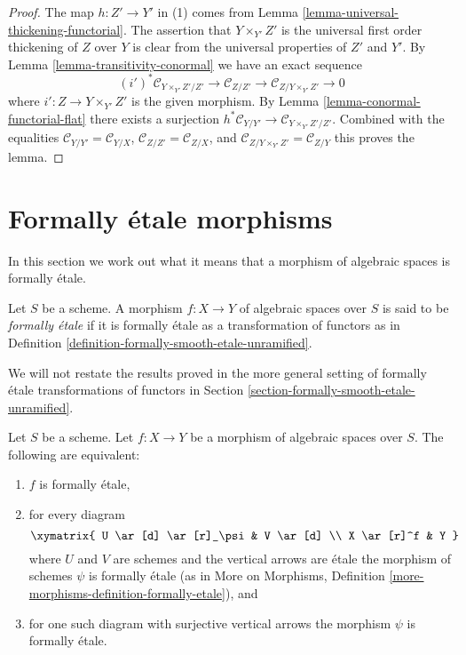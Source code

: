 \begin{proof}
The map $h : Z' \to Y'$ in (1) comes from
Lemma \ref{lemma-universal-thickening-functorial}.
The assertion that $Y \times_{Y'} Z'$ is the universal first order
thickening of $Z$ over $Y$ is clear from the universal properties
of $Z'$ and $Y'$. By
Lemma \ref{lemma-transitivity-conormal}
we have an exact sequence
$$
(i')^*\mathcal{C}_{Y \times_{Y'} Z'/Z'} \to
\mathcal{C}_{Z/Z'} \to
\mathcal{C}_{Z/Y \times_{Y'} Z'} \to 0
$$
where $i' : Z \to Y \times_{Y'} Z'$ is the given morphism. By
Lemma \ref{lemma-conormal-functorial-flat}
there exists a surjection
$h^*\mathcal{C}_{Y/Y'} \to \mathcal{C}_{Y \times_{Y'} Z'/Z'}$.
Combined with the equalities
$\mathcal{C}_{Y/Y'} = \mathcal{C}_{Y/X}$,
$\mathcal{C}_{Z/Z'} = \mathcal{C}_{Z/X}$, and
$\mathcal{C}_{Z/Y \times_{Y'} Z'} = \mathcal{C}_{Z/Y}$
this proves the lemma.
\end{proof}













\section{Formally \'etale morphisms}
\label{section-formally-etale}

\noindent
In this section we work out what it means that a morphism of algebraic spaces
is formally \'etale.

\begin{definition}
\label{definition-formally-etale}
Let $S$ be a scheme. A morphism $f : X \to Y$ of algebraic spaces over $S$
is said to be {\it formally \'etale} if it is formally \'etale as a
transformation of functors as in
Definition \ref{definition-formally-smooth-etale-unramified}.
\end{definition}

\noindent
We will not restate the results proved in the more general setting of
formally \'etale transformations of functors in
Section \ref{section-formally-smooth-etale-unramified}.

\begin{lemma}
\label{lemma-formally-etale}
Let $S$ be a scheme. Let $f : X \to Y$ be a morphism of algebraic spaces over
$S$. The following are equivalent:
\begin{enumerate}
\item $f$ is formally \'etale,
\item for every diagram
$$
\xymatrix{
U \ar[d] \ar[r]_\psi & V \ar[d] \\
X \ar[r]^f & Y
}
$$
where $U$ and $V$ are schemes and the vertical arrows are \'etale
the morphism of schemes $\psi$ is formally \'etale (as in
More on Morphisms,
Definition \ref{more-morphisms-definition-formally-etale}), and
\item for one such diagram with surjective vertical arrows the morphism
$\psi$ is formally \'etale.
\end{enumerate}
\end{lemma}

